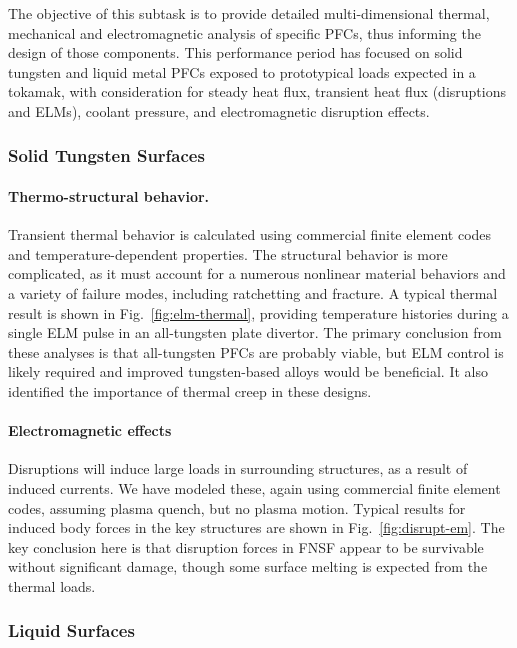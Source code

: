 The objective of this subtask is to provide detailed multi-dimensional
thermal, mechanical and electromagnetic analysis of specific \glspl{PFC}, thus
informing the design of those components.  This performance period has focused
on solid tungsten and liquid metal \glspl{PFC} exposed to prototypical loads
expected in a tokamak, with consideration for steady heat flux, transient heat
flux (disruptions and \glspl{ELM}), coolant pressure, and electromagnetic
disruption effects.


\subsubsection{Solid Tungsten Surfaces}

\paragraph{Thermo-structural behavior.} Transient thermal behavior is
calculated using commercial finite element codes and temperature-dependent
properties. The structural behavior is more complicated, as it must account
for a numerous nonlinear material behaviors and a variety of failure modes,
including ratchetting and fracture. A typical thermal result is shown in
Fig.\ \ref{fig:elm-thermal}, providing temperature histories during a single
\gls{ELM} pulse in an all-tungsten plate divertor. The primary conclusion from
these analyses is that all-tungsten \glspl{PFC} are probably viable, but
\gls{ELM} control is likely required and improved tungsten-based alloys would
be beneficial. It also identified the importance of thermal creep in these
designs.

\paragraph{Electromagnetic effects} Disruptions will induce large loads in
surrounding structures, as a result of induced currents. We have modeled
these, again using commercial finite element codes, assuming plasma quench,
but no plasma motion. Typical results for induced body forces in the key
structures are shown in Fig.\ \ref{fig:disrupt-em}. The key conclusion here is
that disruption forces in FNSF appear to be survivable without significant
damage, though some surface melting is expected from the thermal
loads.

\subsubsection{Liquid Surfaces}

